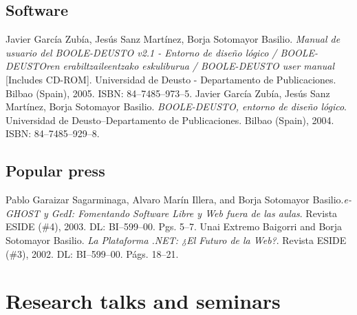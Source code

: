 \documentclass{resume}
\begin{document}
\subsection*{Software}
\begin{category}{}
\citembullet Javier García Zubía, Jesús Sanz Martínez, Borja Sotomayor Basilio. \emph{Manual de usuario del BOOLE-DEUSTO v2.1 - Entorno de diseño lógico / BOOLE-DEUSTOren erabiltzaileentzako eskuliburua / BOOLE-DEUSTO user manual} [Includes CD-ROM]. Universidad de Deusto - Departamento de Publicaciones. Bilbao (Spain), 2005. ISBN: 84--7485--973--5.
\citembullet Javier García Zubía, Jesús Sanz Martínez, Borja Sotomayor Basilio. \emph{BOOLE-DEUSTO, entorno de diseño lógico}. Universidad de Deusto--Departamento de Publicaciones. Bilbao (Spain), 2004. ISBN: 84--7485--929--8.
\end{category}


\subsection*{Popular press}
\begin{category}{}
\citembullet Pablo Garaizar Sagarminaga, Alvaro Marín Illera, and Borja Sotomayor Basilio.\emph{e-GHOST y GedI: Fomentando Software Libre y Web fuera de las aulas}. Revista ESIDE (\#4), 2003. DL: BI--599--00. Pgs. 5--7. 
\citembullet Unai Extremo Baigorri and Borja Sotomayor Basilio.
\emph{La Plataforma .NET: ¿El Futuro de la Web?}. Revista ESIDE
(\#3), 2002. DL: BI--599--00. Págs. 18--21.
\end{category}

\section*{\hspace{-1cm}Research talks and seminars}
\end{document}
